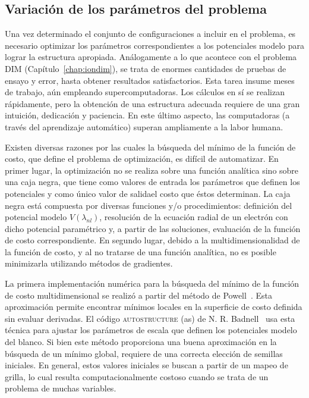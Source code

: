 \subsection{Variación de los parámetros del problema}
\label{sec:powell}

Una vez determinado el conjunto de configuraciones a incluir en el 
problema, es necesario optimizar los parámetros correspondientes a los 
potenciales modelo para lograr la estructura apropiada. Análogamente a 
lo que acontece con el problema DIM (Capítulo~\ref{chap:iondim}), se 
trata de enormes cantidades de pruebas de ensayo y error, hasta obtener 
resultados satisfactorios. Esta tarea insume meses de trabajo, aún 
empleando supercomputadoras. Los cálculos en sí se realizan rápidamente, 
pero la obtención de una estructura adecuada requiere de una gran 
intuición, dedicación y paciencia. En este último aspecto, las 
computadoras (a través del aprendizaje automático) superan ampliamente a 
la labor humana.

Existen diversas razones por las cuales la búsqueda del mínimo de la 
función de costo, que define el problema de optimización, es difícil de 
automatizar. En primer lugar, la optimización no se realiza sobre una 
función analítica sino sobre una caja negra, que tiene como valores de 
entrada los parámetros que definen los potenciales y como único valor de 
salidael costo que éstos determinan. La caja negra está compuesta por 
diversas funciones y/o procedimientos: definición del potencial modelo 
$V(\lambda_{nl})$, resolución de la ecuación radial de un electrón con 
dicho potencial paramétrico y, a partir de las soluciones, evaluación de 
la función de costo correspondiente. En segundo lugar, debido a la 
multidimensionalidad de la función de costo, y al no tratarse de una 
función analítica, no es posible minimizarla utilizando métodos de 
gradientes. 

La primera implementación numérica para la búsqueda del mínimo de la 
función de costo multidimensional se realizó a partir del método de 
Powell~\cite{Powell:64,NumRec:07}. Esta aproximación permite encontrar 
mínimos locales en la superficie de costo definida sin evaluar 
derivadas. El código \textsc{autostructure} (\acs{as}) de N. R. 
Badnell~\cite{Badnell:11} usa esta técnica para ajustar los parámetros 
de escala que definen los potenciales modelo del blanco. Si bien este 
método proporciona una buena aproximación en la búsqueda de un mínimo 
global, requiere de una correcta elección de semillas iniciales. En 
general, estos valores iniciales se buscan a partir de un mapeo de 
grilla, lo cual resulta computacionalmente costoso cuando se trata de un 
problema de muchas variables.

